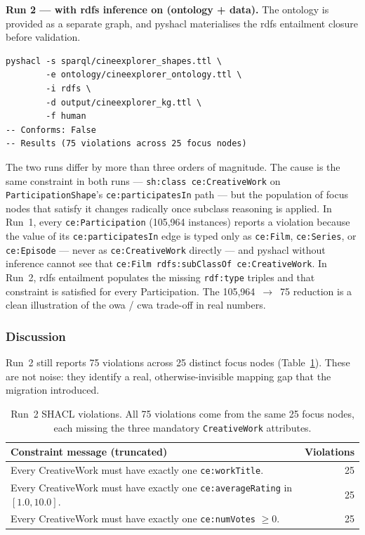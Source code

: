 \textbf{Run 2 --- with \ac{rdfs} inference on (ontology + data).} The ontology is provided as a separate graph, and pyshacl materialises the \ac{rdfs} entailment closure before validation.

\begin{verbatim}
pyshacl -s sparql/cineexplorer_shapes.ttl \
        -e ontology/cineexplorer_ontology.ttl \
        -i rdfs \
        -d output/cineexplorer_kg.ttl \
        -f human
-- Conforms: False
-- Results (75 violations across 25 focus nodes)
\end{verbatim}

\begin{sloppypar}
The two runs differ by more than three orders of magnitude. The cause is the same constraint in both runs --- \texttt{sh:class~ce:CreativeWork} on \texttt{ParticipationShape}'s \texttt{ce:participatesIn} path --- but the population of focus nodes that satisfy it changes radically once subclass reasoning is applied. In Run~1, every \texttt{ce:Participation} (105{,}964 instances) reports a violation because the value of its \texttt{ce:participatesIn} edge is typed only as \texttt{ce:Film}, \texttt{ce:Series}, or \texttt{ce:Episode} --- never as \texttt{ce:CreativeWork} directly --- and pyshacl without inference cannot see that \texttt{ce:Film}~\texttt{rdfs:subClassOf}~\texttt{ce:CreativeWork}. In Run~2, \ac{rdfs} entailment populates the missing \texttt{rdf:type} triples and that constraint is satisfied for every Participation. The 105{,}964~$\to$~75 reduction is a clean illustration of the \ac{owa} / \ac{cwa} trade-off in real numbers.
\end{sloppypar}

\subsubsection{Discussion}
\label{sec:demonstrator-shacl-discussion}

Run~2 still reports 75 violations across 25 distinct focus nodes (Table~\ref{tab:shacl-run2}). These are not noise: they identify a real, otherwise-invisible mapping gap that the migration introduced.

\begin{table}[H]
\centering
\small
\begin{tabular}{lr}
\hline
\textbf{Constraint message (truncated)} & \textbf{Violations} \\
\hline
Every CreativeWork must have exactly one \texttt{ce:workTitle}.        & 25 \\
Every CreativeWork must have exactly one \texttt{ce:averageRating} in $[1.0, 10.0]$. & 25 \\
Every CreativeWork must have exactly one \texttt{ce:numVotes} $\geq 0$. & 25 \\
\hline
\end{tabular}
\caption{Run~2 SHACL violations. All 75 violations come from the same 25 focus nodes, each missing the three mandatory \texttt{CreativeWork} attributes.}
\label{tab:shacl-run2}
\end{table}

